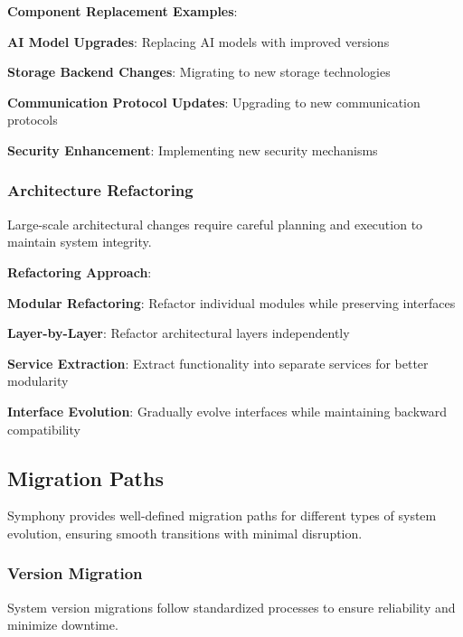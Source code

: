\textbf{Component Replacement Examples}:
\begin{compactlist}
    \item \textbf{AI Model Upgrades}: Replacing AI models with improved versions
    \item \textbf{Storage Backend Changes}: Migrating to new storage technologies
    \item \textbf{Communication Protocol Updates}: Upgrading to new communication protocols
    \item \textbf{Security Enhancement}: Implementing new security mechanisms
\end{compactlist}

\subsubsection*{Architecture Refactoring}

Large-scale architectural changes require careful planning and execution to maintain system integrity.

\textbf{Refactoring Approach}:
\begin{compactlist}
    \item \textbf{Modular Refactoring}: Refactor individual modules while preserving interfaces
    \item \textbf{Layer-by-Layer}: Refactor architectural layers independently
    \item \textbf{Service Extraction}: Extract functionality into separate services for better modularity
    \item \textbf{Interface Evolution}: Gradually evolve interfaces while maintaining backward compatibility
\end{compactlist}

\subsection*{Migration Paths}

Symphony provides well-defined migration paths for different types of system evolution, ensuring smooth transitions with minimal disruption.

\subsubsection*{Version Migration}

System version migrations follow standardized processes to ensure reliability and minimize downtime.

